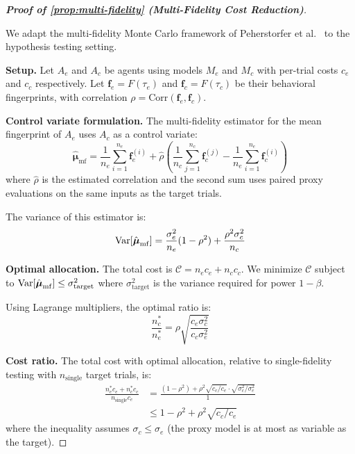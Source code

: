 \begin{proof}[\textbf{Proof of \cref{prop:multi-fidelity} (Multi-Fidelity Cost Reduction)}]
\label{app:proof:multi-fidelity}

We adapt the multi-fidelity Monte Carlo framework of Peherstorfer
et al.~\citep{peherstorfer2018survey} to the hypothesis testing setting.

\textbf{Setup.} Let $A_e$ and $A_c$ be agents using models $M_e$ and
$M_c$ with per-trial costs $c_e$ and $c_c$ respectively. Let
$\mathbf{f}_e = F(\tau_e)$ and $\mathbf{f}_c = F(\tau_c)$ be their
behavioral fingerprints, with correlation
$\rho = \mathrm{Corr}(\mathbf{f}_e, \mathbf{f}_c)$.

\textbf{Control variate formulation.} The multi-fidelity estimator
for the mean fingerprint of $A_e$ uses $A_c$ as a control variate:
\begin{equation}
  \hat{\boldsymbol{\mu}}_{\mathrm{mf}} =
    \frac{1}{n_e}\sum_{i=1}^{n_e} \mathbf{f}_e^{(i)}
    + \hat{\rho}\left(
      \frac{1}{n_c}\sum_{j=1}^{n_c} \mathbf{f}_c^{(j)}
      - \frac{1}{n_e}\sum_{i=1}^{n_e} \mathbf{f}_c^{(i)}
    \right)
\end{equation}
where $\hat{\rho}$ is the estimated correlation and the second sum
uses paired proxy evaluations on the same inputs as the target trials.

The variance of this estimator is:
\begin{equation}
  \mathrm{Var}[\hat{\boldsymbol{\mu}}_{\mathrm{mf}}] =
    \frac{\sigma_e^2}{n_e}(1 - \rho^2) +
    \frac{\rho^2 \sigma_c^2}{n_c}
\end{equation}

\textbf{Optimal allocation.} The total cost is
$\mathcal{C} = n_e c_e + n_c c_c$. We minimize $\mathcal{C}$ subject to
$\mathrm{Var}[\hat{\boldsymbol{\mu}}_{\mathrm{mf}}] \leq
\sigma^2_{\mathrm{target}}$ where $\sigma^2_{\mathrm{target}}$ is the
variance required for power $1 - \beta$.

Using Lagrange multipliers, the optimal ratio is:
\begin{equation}
  \frac{n_c^*}{n_e^*} = \rho \sqrt{\frac{c_e \sigma_c^2}{c_c \sigma_e^2}}
\end{equation}

\textbf{Cost ratio.} The total cost with optimal allocation, relative
to single-fidelity testing with $n_{\mathrm{single}}$ target trials, is:
\begin{align}
  \frac{n_e^* c_e + n_c^* c_c}{n_{\mathrm{single}} c_e}
  &= \frac{(1 - \rho^2) + \rho^2 \sqrt{c_c / c_e} \cdot
    \sqrt{\sigma_c^2 / \sigma_e^2}}{1} \\
  &\leq 1 - \rho^2 + \rho^2 \sqrt{c_c / c_e}
\end{align}
where the inequality assumes $\sigma_c \leq \sigma_e$ (the proxy model
is at most as variable as the target).


\end{proof}
